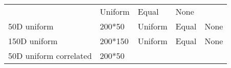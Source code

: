 \documentclass[]{article}
\begin{document}
\begin{longtable}[]{@{}lllll@{}}
\begin{minipage}[t]{0.08\columnwidth}
\end{minipage} & \begin{minipage}[t]{0.31\columnwidth}\raggedright\strut
Uniform\strut
\end{minipage} & \begin{minipage}[t]{0.21\columnwidth}\raggedright\strut
Equal\strut
\end{minipage} & \begin{minipage}[t]{0.13\columnwidth}\raggedright\strut
None\strut
\end{minipage}\tabularnewline
\begin{minipage}[t]{0.12\columnwidth}\raggedright\strut
50D uniform\strut
\end{minipage} & \begin{minipage}[t]{0.08\columnwidth}\raggedright\strut
200*50\strut
\end{minipage} & \begin{minipage}[t]{0.31\columnwidth}\raggedright\strut
Uniform\strut
\end{minipage} & \begin{minipage}[t]{0.21\columnwidth}\raggedright\strut
Equal\strut
\end{minipage} & \begin{minipage}[t]{0.13\columnwidth}\raggedright\strut
None\strut
\end{minipage}\tabularnewline
\begin{minipage}[t]{0.12\columnwidth}\raggedright\strut
150D uniform\strut
\end{minipage} & \begin{minipage}[t]{0.08\columnwidth}\raggedright\strut
200*150\strut
\end{minipage} & \begin{minipage}[t]{0.31\columnwidth}\raggedright\strut
Uniform\strut
\end{minipage} & \begin{minipage}[t]{0.21\columnwidth}\raggedright\strut
Equal\strut
\end{minipage} & \begin{minipage}[t]{0.13\columnwidth}\raggedright\strut
None\strut
\end{minipage}\tabularnewline
\begin{minipage}[t]{0.12\columnwidth}\raggedright\strut
50D uniform correlated\strut
\end{minipage} & \begin{minipage}[t]{0.08\columnwidth}\raggedright\strut
200*50\strut
\end{minipage} & \begin{minipage}[t]{0.31\columnwidth}\raggedright\strut

\end{minipage}
\end{longtable}
\end{document}
